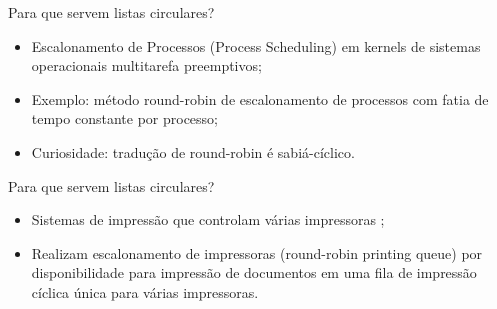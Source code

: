\documentclass[12pt,table,xcolor={dvipsnames}]{beamer}
\begin{document}
\begin{frame}[fragile]{Para que servem listas circulares?}
\begin{itemize}
\item Escalonamento de Processos (Process Scheduling) em kernels de sistemas operacionais multitarefa preemptivos;
\item Exemplo: método round-robin de escalonamento de processos com fatia de tempo constante por processo;\pause
\item Curiosidade: tradução de round-robin é sabiá-cíclico.
\end{itemize}
\end{frame}

\begin{frame}[fragile]{Para que servem listas circulares?}
\begin{itemize}
\item Sistemas de impressão que controlam várias impressoras ;
\item Realizam escalonamento de impressoras (round-robin printing queue) por disponibilidade para impressão de documentos em uma fila de impressão cíclica única para várias impressoras.
\end{itemize}
\end{frame}
\end{document}
